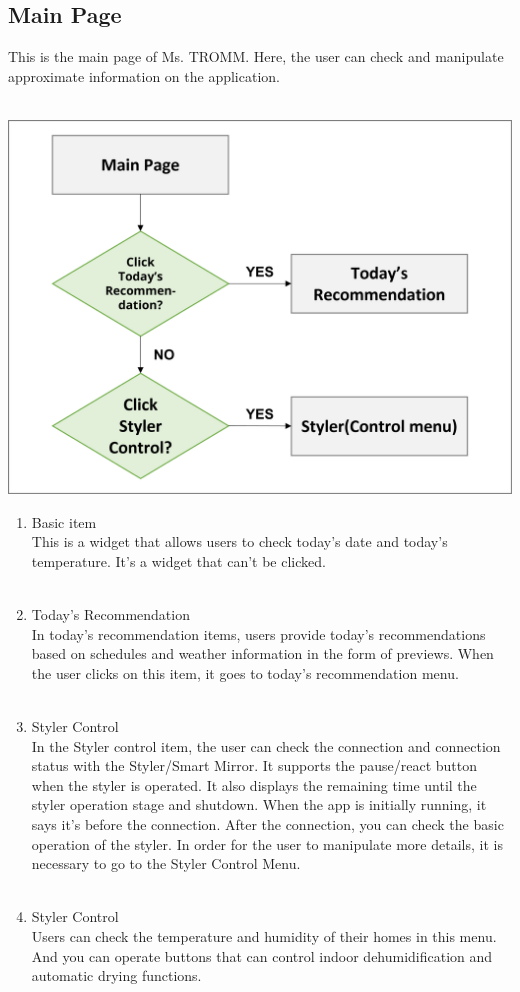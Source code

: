 \documentclass[conference]{IEEEtran}
\begin{document}
\subsection{Main Page}
This is the main page of Ms. TROMM. Here, the user can check and manipulate approximate information on the application. \\ \\
\centerline{\includegraphics[scale=0.5]{assets/flow_3.png}}
\begin{enumerate}
    \item Basic item\\
        This is a widget that allows users to check today's date and today's temperature. It's a widget that can't be clicked.  \\ \\
    \item Today's Recommendation\\
        In today's recommendation items, users provide today's recommendations based on schedules and weather information in the form of previews. When the user clicks on this item, it goes to today's recommendation menu.\\ \\
    \item Styler Control\\
        In the Styler control item, the user can check the connection and connection status with the Styler/Smart Mirror.  It supports the pause/react button when the styler is operated. It also displays the remaining time until the styler operation stage and shutdown. When the app is initially running, it says it's before the connection. After the connection, you can check the basic operation of the styler. In order for the user to manipulate more details, it is necessary to go to the Styler Control Menu. \\ \\
    \item Styler Control\\
        Users can check the temperature and humidity of their homes in this menu. And you can operate buttons that can control indoor dehumidification and automatic drying functions. \\ \\
\end{enumerate}
\end{document}
